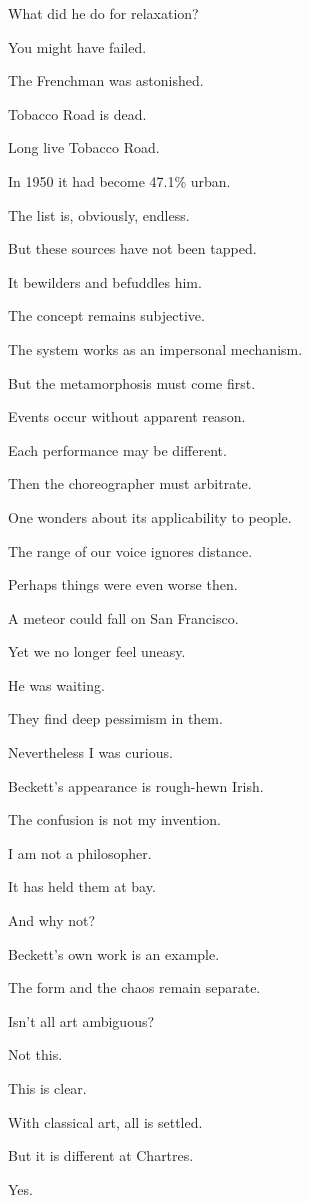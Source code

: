What did he do for relaxation?

You might have failed. 

The Frenchman was astonished. 

Tobacco Road is dead. 

Long live Tobacco Road. 

In 1950 it had become 47.1\% urban. 

The list is, obviously, endless. 

But these sources have not been tapped. 

It bewilders and befuddles him. 

The concept remains subjective. 

The system works as an impersonal mechanism. 

But the metamorphosis must come first. 

Events occur without apparent reason. 

Each performance may be different. 

Then the choreographer must arbitrate. 

One wonders about its applicability to people. 

The range of our voice ignores distance. 


Perhaps things were even worse then. 

A meteor could fall on San Francisco. 

Yet we no longer feel uneasy. 


He was waiting. 

They find deep pessimism in them. 

Nevertheless I was curious. 

Beckett's appearance is rough-hewn Irish. 

The confusion is not my invention. 

I am not a philosopher. 

It has held them at bay. 

And why not?

Beckett's own work is an example. 

The form and the chaos remain separate. 

Isn't all art ambiguous?

Not this. 

This is clear. 

With classical art, all is settled. 

But it is different at Chartres. 

Yes. 

